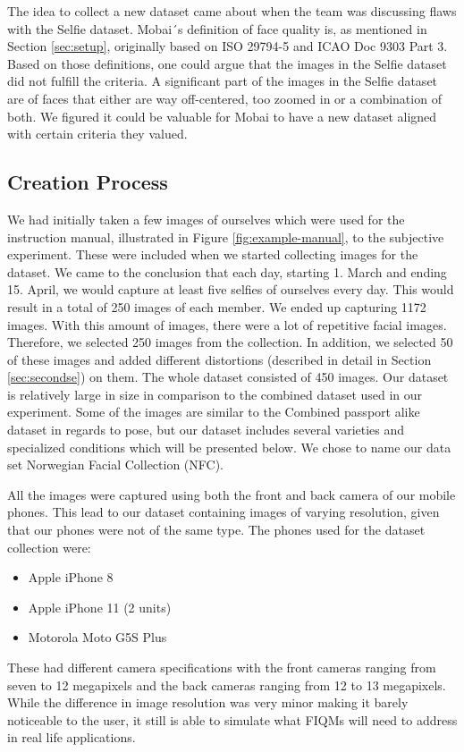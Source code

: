 The idea to collect a new dataset came about when the team was discussing flaws with the Selfie dataset. Mobai´s definition of face quality is, as mentioned in Section \ref{sec:setup}, originally based on ISO 29794-5 and ICAO Doc 9303 Part 3. Based on those definitions, one could argue that the images in the Selfie dataset did not fulfill the criteria. A significant part of the images in the Selfie dataset are of faces that either are way off-centered, too zoomed in or a combination of both. We figured it could be valuable for Mobai to have a new dataset aligned with certain criteria they valued. 

\subsection*{Creation Process}
We had initially taken a few images of ourselves which were used for the instruction manual, illustrated in Figure \ref{fig:example-manual}, to the subjective experiment. These were included when we started collecting images for the dataset. We came to the conclusion that each day, starting 1. March and ending 15. April, we would capture at least five selfies of ourselves every day. This would result in a total of 250 images of each member. We ended up capturing 1172 images. With this amount of images, there were a lot of repetitive facial images. Therefore, we selected 250 images from the collection. In addition, we selected 50 of these images and added different distortions (described in detail in Section \ref{sec:secondse}) on them. The whole dataset consisted of 450 images. Our dataset is relatively large in size in comparison to the combined dataset used in our experiment. Some of the images are similar to the Combined passport alike dataset in regards to pose, but our dataset includes several varieties and specialized conditions which will be presented below. We chose to name our data set Norwegian Facial Collection (NFC).

All the images were captured using both the front and back camera of our mobile phones. This lead to our dataset containing images of varying resolution, given that our phones were not of the same type. The phones used for the dataset collection were:
\begin{itemize}
    \item Apple iPhone 8 
    \item Apple iPhone 11 (2 units)
    \item Motorola Moto G5S Plus 
\end{itemize}
%
These had different camera specifications with the front cameras ranging from seven to 12 megapixels and the back cameras ranging from 12 to 13 megapixels. While the difference in image resolution was very minor making it barely noticeable to the user, it still is able to simulate what FIQMs will need to address in real life applications. 

